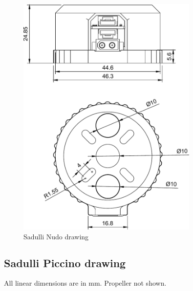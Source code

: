 \begin{figure}[!hbt]
    \centerline{\includegraphics[width=0.8\textwidth]{figures/sadulli_nudo}}
    \caption{Sadulli Nudo drawing}
\end{figure}

\newpage

\subsection{Sadulli Piccino drawing}
All linear dimensions are in mm. Propeller not shown.

